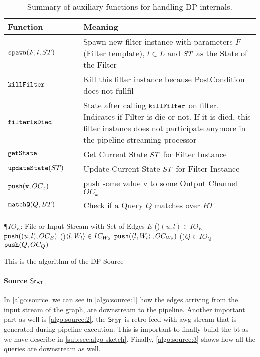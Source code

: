 \begin{table}[!htp]
\centering
\begin{tabular}{|p{0.3\linewidth}|p{0.7\linewidth}|} \hline
\textbf{Function} & \textbf{Meaning}\\ \hline
$\mathtt{spawn}(F,l,ST)$ & Spawn new filter instance with parameters $F$ (Filter template), $l \in L$ and $ST$ as the State of the Filter\\\hline
$\mathtt{killFilter}$ & Kill this filter instance because PostCondition does not fullfil\\ \hline
$\mathtt{filterIsDied}$ & State after calling $\mathtt{killFilter}$ on filter. Indicates if Filter is die or not. If it is died, this filter instance does not participate anymore in the pipeline streaming processor\\ \hline
$\mathtt{getState}$ & Get Current State $ST$ for Filter Instance \\ \hline
$\mathtt{updateState}(ST)$ & Update Current State $ST$ for Filter Instance \\ \hline
$\mathtt{push}(\mathtt{v}, OC_x)$ & push some value $\mathtt{v}$ to some Output Channel $OC_x$ \\\hline
$\mathtt{matchQ}(Q, BT)$ & Check if a Query $Q$ matches over $BT$ \\ \hline
\end{tabular}
\caption{Summary of auxiliary functions for handling DP internals.}
\label{table:aux:fn}
\end{table}
      
\begin{algorithm}
\P{$IO_E$: File or Input Stream with Set of Edges $E$}
\ForAll(){$(u,l) \in IO_E$}
{$\mathtt{push}((u,l), OC_E)$ \label{algo:source:1}
}
\ForAll(){$\left\langle l, W_l \right\rangle \in IC_{W_2}$}
{$\mathtt{push}(\left\langle l, W_l \right\rangle, OC_{W_2})$ \label{algo:source:2}
}
\ForAll(){$Q \in IO_Q$}
{$\mathtt{push}(Q, OC_Q)$ \label{algo:source:3}
}
\caption{This is the algorithm of the DP Source}
\label{algo:source}
\end{algorithm}

\paragraph{Source $\mathsf{Sr_{BT}}$} In \autoref{algo:source} we can see in \autoref{algo:source:1} how the edges arriving from the input stream of the graph, are downstream to the pipeline. 
Another important part as well is \autoref{algo:source:2}, the $\mathsf{Sr_{BT}}$ is retro feed with \acrshort{awg} stream that is generated during pipeline execution.
This is important to finally build the \acrshort{bt} as we have describe in \autoref{sub:sec:algo-sketch}. Finally, \autoref{algo:source:3} shows how all the queries are downstream as well.

